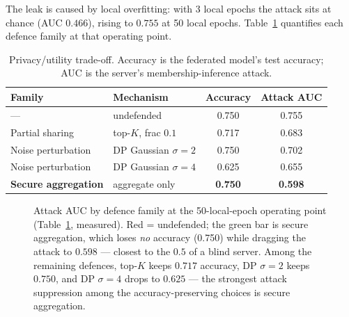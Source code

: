 \documentclass[11pt,a4paper]{article}
\theoremstyle{plain}
\theoremstyle{definition}
\begin{document}
The leak is caused by local overfitting: with 3 local epochs the attack sits
at chance (AUC $0.466$), rising to $0.755$ at 50 local epochs.
Table~\ref{tab:fed} quantifies each defence family at that operating point.

\begin{table}[h]
\centering
\caption{Privacy/utility trade-off. Accuracy is the federated model's test
accuracy; AUC is the server's membership-inference attack.}
\begin{tabular}{llcc}
\toprule
\textbf{Family} & \textbf{Mechanism} & \textbf{Accuracy} & \textbf{Attack AUC} \\
\midrule
---                 & undefended            & 0.750 & 0.755 \\
Partial sharing     & top-$K$, frac $0.1$   & 0.717 & 0.683 \\
Noise perturbation  & DP Gaussian $\sigma=2$& 0.750 & 0.702 \\
Noise perturbation  & DP Gaussian $\sigma=4$& 0.625 & 0.655 \\
\textbf{Secure aggregation} & aggregate only & \textbf{0.750} & \textbf{0.598} \\
\bottomrule
\end{tabular}
\label{tab:fed}
\end{table}

\begin{figure}[h]
\centering
{}
\caption{Attack AUC by defence family at the 50-local-epoch operating point
(Table~\protect\ref{tab:fed}, measured). Red = undefended; the green bar is secure
aggregation, which loses \emph{no} accuracy (0.750) while dragging the
attack to $0.598$ --- closest to the $0.5$ of a blind server. Among the
remaining defences, top-$K$ keeps $0.717$ accuracy, DP $\sigma{=}2$ keeps
$0.750$, and DP $\sigma{=}4$ drops to $0.625$ --- the strongest attack
suppression among the accuracy-preserving choices is secure aggregation.}
\label{fig:fed}
\end{figure}
\end{document}
